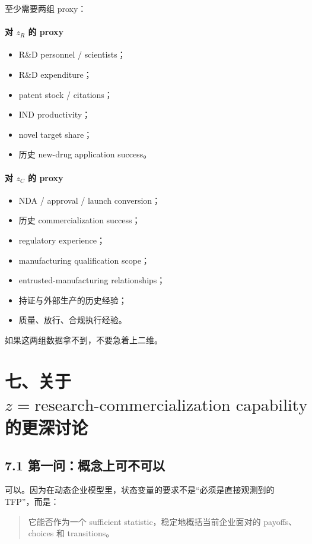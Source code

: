 \documentclass[12pt]{ctexart}
\begin{document}
至少需要两组 proxy：

\paragraph{对 \(z_R\) 的 proxy}
\begin{itemize}[leftmargin=2em]
    \item R\&D personnel / scientists；
    \item R\&D expenditure；
    \item patent stock / citations；
    \item IND productivity；
    \item novel target share；
    \item 历史 new-drug application success。
\end{itemize}

\paragraph{对 \(z_C\) 的 proxy}
\begin{itemize}[leftmargin=2em]
    \item NDA / approval / launch conversion；
    \item 历史 commercialization success；
    \item regulatory experience；
    \item manufacturing qualification scope；
    \item entrusted-manufacturing relationships；
    \item 持证与外部生产的历史经验；
    \item 质量、放行、合规执行经验。
\end{itemize}

如果这两组数据拿不到，不要急着上二维。

\section{七、关于 \texorpdfstring{$z=\text{research-commercialization capability}$}{z = research-commercialization capability} 的更深讨论}

\subsection{7.1 第一问：概念上可不可以}

可以。因为在动态企业模型里，状态变量的要求不是“必须是直接观测到的 TFP”，而是：

\begin{quote}
它能否作为一个 sufficient statistic，稳定地概括当前企业面对的 payoffs、choices 和 transitions。
\end{quote}
\end{document}
